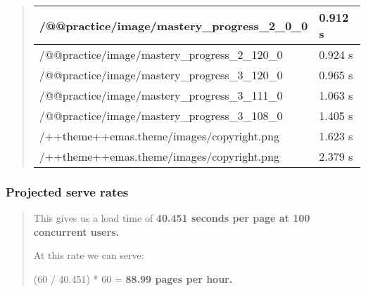 \documentclass[letterpaper,10pt,english]{sphinxmanual}
\begin{document}
\begin{quote}
\begin{tabulary}{\linewidth}{|L|L|}
/@@practice/image/mastery\_progress\_2\_0\_0
 & 
0.912 s
\\\hline

/@@practice/image/mastery\_progress\_2\_120\_0
 & 
0.924 s
\\\hline

/@@practice/image/mastery\_progress\_3\_120\_0
 & 
0.965 s
\\\hline

/@@practice/image/mastery\_progress\_3\_111\_0
 & 
1.063 s
\\\hline

/@@practice/image/mastery\_progress\_3\_108\_0
 & 
1.405 s
\\\hline

/++theme++emas.theme/images/copyright.png
 & 
1.623 s
\\\hline

/++theme++emas.theme/images/copyright.png
 & 
2.379 s
\\\hline
\end{tabulary}

\end{quote}


\subsubsection{Projected serve rates}
\label{index:id4}\begin{quote}

This gives us a  load time of \textbf{40.451 seconds per page at 100
concurrent users.}

At this rate we can serve:

(60 / 40.451) * 60 = \textbf{88.99 pages per hour.}
\end{quote}
\end{document}
